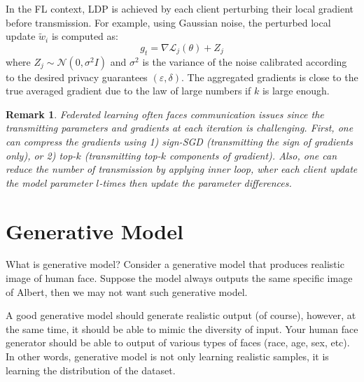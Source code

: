 \documentclass[11pt, a4paper]{article}
\newtheorem{remark}{Remark}
\begin{document}
In the FL context, LDP is achieved by each client perturbing their local gradient before transmission.
For example, using Gaussian noise, the perturbed local update $\tilde{w}_i$ is computed as:
\begin{equation}
g_t = \nabla \mathcal{L}_j(\theta)+ Z_j
\end{equation}
where $Z_j\sim \mathcal{N}(0, \sigma^2I)$ and $\sigma^2$ is the variance of the noise calibrated 
according to the desired privacy guarantees $(\varepsilon, \delta)$.
The aggregated gradients is close to the true averaged gradient due to the law of large numbers if $k$ is large enough.

\begin{remark}
    Federated learning often faces communication issues since the transmitting parameters and gradients at each iteration is challenging.
    First, one can compress the gradients using 1) sign-SGD (transmitting the sign of gradients only),
    or 2) top-$k$ (transmitting top-$k$ components of gradient).
    Also, one can reduce the number of transmission by applying inner loop,
    wher each client update the model parameter $l$-times then update the parameter differences.
\end{remark}















\newpage
\section{Generative Model} \label{sec:diffusion-generative}
What is generative model?
Consider a generative model that produces realistic image of human face.
Suppose the model always outputs the same specific image of Albert, 
then we may not want such generative model.

A good generative model should generate realistic output (of course),
however, at the same time, it should be able to mimic the diversity of input.
Your human face generator should be able to output of various types of faces (race, age, sex, etc).
In other words, generative model is not only learning realistic samples, 
it is learning the distribution of the dataset.
\end{document}
